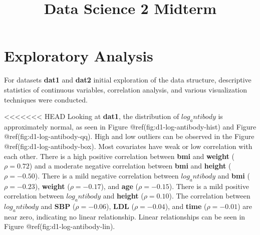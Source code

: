 \documentclass[
]{article}
\title{Data Science 2 Midterm}
\author{}
\date{\vspace{-2.5em}}
\begin{document}
\maketitle

\section{Exploratory Analysis}\label{exploratory-analysis}

For datasets \textbf{dat1} and \textbf{dat2} initial exploration of the
data structure, descriptive statistics of continuous variables,
correlation analysis, and various visualization techniques were
conducted.

\textless\textless\textless\textless\textless\textless\textless{} HEAD
Looking at \textbf{dat1}, the distribution of \textbf{$log_antibody$} is
approximately normal, as seen in Figure @ref(fig:d1-log-antibody-hist)
and Figure @ref(fig:d1-log-antibody-qq). High and low outliers can be
observed in the Figure @ref(fig:d1-log-antibody-box). Most covariates
have weak or low correlation with each other. There is a high positive
correlation between \textbf{bmi} and \textbf{weight} (\(\rho = 0.72\))
and a moderate negative correlation between \textbf{bmi} and
\textbf{height} (\(\rho = -0.50\)). There is a mild negative correlation
between \textbf{$log_antibody$} and \textbf{bmi} (\(\rho = -0.23\)),
\textbf{weight} (\(\rho = -0.17\)), and \textbf{age} (\(\rho = -0.15\)).
There is a mild positive correlation between \textbf{$log_antibody$} and
\textbf{height} (\(\rho = 0.10\)). The correlation between
\textbf{$log_antibody$} and \textbf{SBP} (\(\rho = -0.06\)),
\textbf{LDL} (\(\rho = -0.04\)), and \textbf{time} (\(\rho = -0.01\))
are near zero, indicating no linear relationship. Linear relationships
can be seen in Figure @ref(fig:d1-log-antibody-lin).
\end{document}
